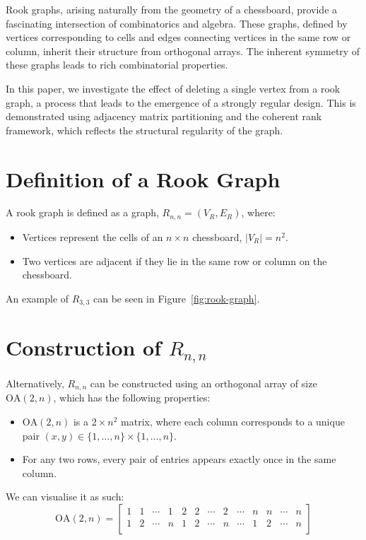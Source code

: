 \documentclass{article}
\begin{document}
Rook graphs, arising naturally from the geometry of a chessboard, provide a fascinating intersection of combinatorics and algebra. These graphs, defined by vertices corresponding to cells and edges connecting vertices in the same row or column, inherit their structure from orthogonal arrays. The inherent symmetry of these graphs leads to rich combinatorial properties.

In this paper, we investigate the effect of deleting a single vertex from a rook graph, a process that leads to the emergence of a strongly regular design. This is demonstrated using adjacency matrix partitioning and the coherent rank framework, which reflects the structural regularity of the graph.

\section{Definition of a Rook Graph}

A rook graph is defined as a graph, \(R_{n,n} = (V_R,E_R)\), where:
\begin{itemize}
    \item Vertices represent the cells of an \( n \times n \) chessboard, \(|V_R| = n^2\).
    \item Two vertices are adjacent if they lie in the same row or column on the chessboard.
\end{itemize}
An example of \(R_{3,3}\) can be seen in Figure~\ref{fig:rook-graph}. 

\section{Construction of \(R_{n,n}\)}

Alternatively, \(R_{n,n}\) can be constructed using an orthogonal array of size \( \text{OA}(2, n) \), which has the following properties:
\begin{itemize}
    \item \( \text{OA}(2, n) \) is a \( 2 \times n^2 \) matrix, where each column corresponds to a unique pair \( (x, y) \in \{1, \dots, n\} \times \{1, \dots, n\} \).
    \item For any two rows, every pair of entries appears exactly once in the same column.
\end{itemize}

We can visualise it as such:
$$
\text{OA}(2, n) = \begin{bmatrix}
    1 & 1 & \cdots & 1 & 2 & 2 & \cdots & 2 & \cdots & n & n & \cdots & n \\
    1 & 2 & \cdots & n & 1 & 2 & \cdots & n & \cdots & 1 & 2 & \cdots & n \\
\end{bmatrix}
$$
\end{document}
